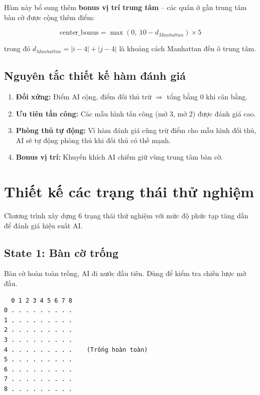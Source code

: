 \documentclass[12pt,a4paper]{article}
\begin{document}
Hàm này bổ sung thêm \textbf{bonus vị trí trung tâm} -- các quân ở gần trung tâm bàn cờ được cộng thêm điểm:

$$\text{center\_bonus} = \max(0,\ 10 - d_{Manhattan}) \times 5$$

trong đó $d_{Manhattan} = |i - 4| + |j - 4|$ là khoảng cách Manhattan đến ô trung tâm.

\subsection{Nguyên tắc thiết kế hàm đánh giá}

\begin{enumerate}
    \item \textbf{Đối xứng:} Điểm AI cộng, điểm đối thủ trừ $\Rightarrow$ tổng bằng 0 khi cân bằng.
    \item \textbf{Ưu tiên tấn công:} Các mẫu hình tấn công (mở 3, mở 2) được đánh giá cao.
    \item \textbf{Phòng thủ tự động:} Vì hàm đánh giá cũng trừ điểm cho mẫu hình đối thủ, AI sẽ tự động phòng thủ khi đối thủ có thế mạnh.
    \item \textbf{Bonus vị trí:} Khuyến khích AI chiếm giữ vùng trung tâm bàn cờ.
\end{enumerate}

\section{Thiết kế các trạng thái thử nghiệm}

Chương trình xây dựng 6 trạng thái thử nghiệm với mức độ phức tạp tăng dần để đánh giá hiệu suất AI.

\subsection{State 1: Bàn cờ trống}
Bàn cờ hoàn toàn trống, AI đi nước đầu tiên. Dùng để kiểm tra chiến lược mở đầu.

\begin{verbatim}
  0 1 2 3 4 5 6 7 8
0 . . . . . . . . .
1 . . . . . . . . .
2 . . . . . . . . .
3 . . . . . . . . .
4 . . . . . . . . .    (Trống hoàn toàn)
5 . . . . . . . . .
6 . . . . . . . . .
7 . . . . . . . . .
8 . . . . . . . . .
\end{verbatim}
\end{document}
